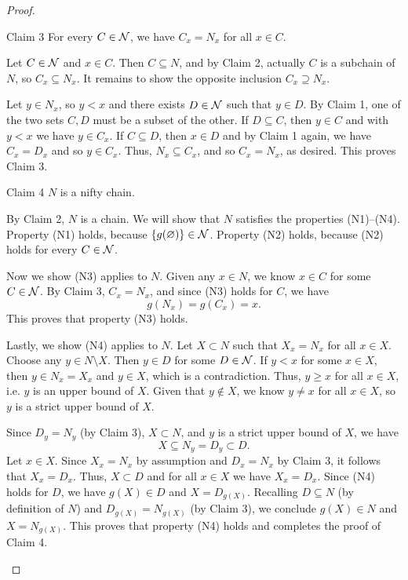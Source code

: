 \begin{proof}
	\begin{manualthm}{Claim 3}
		For every $C\in\mathcal{N}$, we have $C_{x} = N_{x}$ for all $x\in C$.
	\end{manualthm}
	\begin{claimproof}
		Let $C\in\mathcal{N}$ and $x\in C$.
		Then $C\subseteq N$, and by Claim 2, actually $C$ is a subchain of $N$, so $C_{x}\subseteq N_{x}$.
		It remains to show the opposite inclusion $C_{x}\supseteq N_{x}$. 
		
		Let $y\in N_{x}$, so $y < x$ and there exists $D\in\mathcal{N}$ such that $y\in D$. 
		By Claim 1, one of the two sets $C, D$ must be a subset of the other.
		If $D\subseteq C$, then $y\in C$ and with $y < x$ we have $y\in C_{x}$. 
		If $C\subseteq D$, then $x\in D$ and by Claim 1 again, we have $C_{x} = D_{x}$ and so $y\in C_{x}$. 
		Thus, $N_{x}\subseteq C_{x}$, and so $C_{x} = N_{x}$, as desired.
		This proves Claim 3.
	\end{claimproof}
	
	\begin{manualthm}{Claim 4}
		$N$ is a nifty chain.
	\end{manualthm}
	\begin{claimproof}
		By Claim 2, $N$ is a chain.
		We will show that $N$ satisfies the properties (N1)--(N4).
		Property (N1) holds, because $\{g(\varnothing)\}\in\mathcal{N}$.
		Property (N2) holds, because (N2) holds for every $C\in\mathcal{N}$.
		
		Now we show (N3) applies to $N$.
		Given any $x\in N$, we know $x\in C$ for some $C\in\mathcal{N}$.
		By Claim 3, $C_{x} = N_{x}$, and since (N3) holds for $C$, we have
		\[ g(N_{x}) = g(C_{x}) = x. \]
		This proves that property (N3) holds.
		
		Lastly, we show (N4) applies to $N$.
		Let $X\subset N$ such that $X_{x} = N_{x}$ for all $x\in X$. 
		Choose any $y\in N\setminus X$. 
		Then $y\in D$ for some $D\in\mathcal{N}$. 
		If $y < x$ for some $x\in X$, then $y\in N_{x} = X_{x}$ and $y\in X$, which is a contradiction.
		Thus, $y\ge x$ for all $x\in X$, i.e. $y$ is an upper bound of $X$.
		Given that $y\notin X$, we know $y\ne x$ for all $x\in X$, so $y$ is a strict upper bound of $X$.
		
		Since $D_{y} = N_{y}$ (by Claim 3), $X\subset N$, and $y$ is a strict upper bound of $X$, we have
		\[ X\subseteq N_{y} = D_{y}\subset D. \]
		Let $x\in X$. 
		Since $X_{x} = N_{x}$ by assumption and $D_{x} = N_{x}$ by Claim 3, it follows that $X_{x} = D_{x}$.
		Thus, $X\subset D$ and for all $x\in X$ we have $X_{x} = D_{x}$.
		Since (N4) holds for $D$, we have $g(X)\in D$ and $X = D_{g(X)}$. 
		Recalling $D\subseteq N$ (by definition of $N$) and $D_{g(X)} = N_{g(X)}$ (by Claim 3), we conclude $g(X)\in N$ and $X = N_{g(X)}$. 
		This proves that property (N4) holds and completes the proof of Claim 4.
	\end{claimproof}
	

\end{proof}
